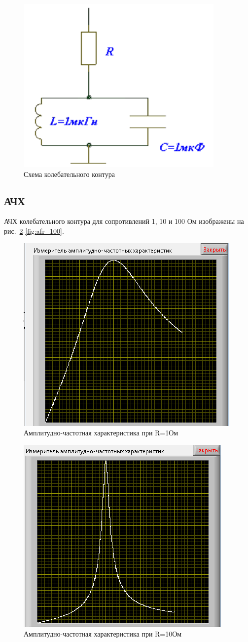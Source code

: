 \documentclass[a4paper,14pt]{article}
\begin{document}
\begin{figure}[H]
	\centering
	\includegraphics[width=0.4\linewidth]{image/schema}
	\caption{Схема колебательного контура}
	\label{fig:schema}
\end{figure}

\subsection{АЧХ}

АЧХ колебательного контура для сопротивлений 1, 10 и 100 Ом изображены на рис.~\ref{fig:afr_1}-\ref{fig:afr_100}.

\begin{figure}[H]
	\centering
	\includegraphics[width=0.5\linewidth]{image/afr_1}
	\caption{Амплитудно-частотная характеристика при R=1Ом}
	\label{fig:afr_1}
\end{figure}

\begin{figure}[H]
	\centering
	\includegraphics[width=0.5\linewidth]{image/afr_10}
	\caption{Амплитудно-частотная характеристика при R=10Ом}
	\label{fig:afr_10}
\end{figure}
\end{document}
